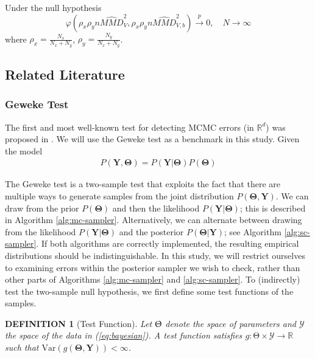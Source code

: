 \documentclass[a4paper,11pt]{article}
\newtheorem{definition}[theorem]{DEFINITION}
\newcommand{\var}{\mathrm{Var}}
\begin{document}
Under the null hypothesis
\begin{equation*}
    \varphi\left(\rho_{x} \rho_{y} n \widehat{MMD}_{V}^{2}, \rho_{x} \rho_{y} n \widehat{MMD}^{2}_{V, b}\right) \xrightarrow[]{p} 0, \quad N \rightarrow \infty
\end{equation*}
where $\rho_{x} = \frac{N_{x}}{N_{x} + N_{y}}$, $\rho_{y} = \frac{N_{y}}{N_{x} + N_{y}}$.

\subsection{Related Literature}
\subsubsection{Geweke Test}
The first and most well-known test for detecting MCMC errors (in $\mathbb{R}^{d}$) was proposed in \cite{geweke_getting_2004}. We will use the Geweke test as a benchmark in this study. Given the model
\begin{align}
    P(\mathbf{Y}, \mathbf{\Theta}) = P(\mathbf{Y} | \mathbf{\Theta}) P(\mathbf{\Theta})
    \label{eq:bayesian}
\end{align}

The Geweke test is a two-sample test that exploits the fact that there are multiple ways to generate samples from the joint distribution $P(\mathbf{\Theta}, \mathbf{Y})$. We can draw from the prior $P(\mathbf{\Theta})$ and then the likelihood $P(\mathbf{Y}| \mathbf{\Theta})$; this is described in Algorithm \ref{alg:mc-sampler}. Alternatively, we can alternate between drawing from the likelihood $P(\mathbf{Y}| \mathbf{\Theta})$ and the posterior $P(\mathbf{\Theta}|\mathbf{Y})$; see Algorithm \ref{alg:sc-sampler}. If both algorithms are correctly implemented, the resulting empirical distributions should be indistinguishable. In this study, we will restrict ourselves to examining errors within the posterior sampler we wish to check, rather than other parts of Algorithms \ref{alg:mc-sampler} and \ref{alg:sc-sampler}. To (indirectly) test the two-sample null hypothesis, we first define some test functions of the samples.

\begin{definition}[Test Function]
    Let $\mathbf{\Uptheta}$ denote the space of parameters and $\mathcal{Y}$ the space of the data in (\ref{eq:bayesian}). A test function satisfies $g:\mathrm{\Theta} \times \mathcal{Y} \rightarrow \mathbb{R}$ such that $\var(g(\mathbf{\Theta}, \mathbf{Y})) < \infty$. 
\end{definition}
\end{document}
